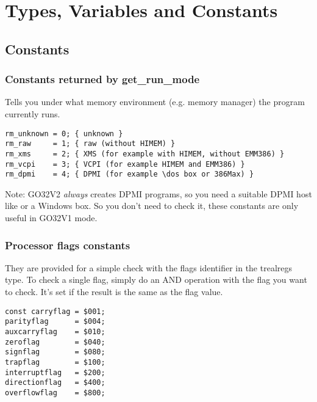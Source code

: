\section{Types, Variables and Constants}
\subsection{Constants}
\subsubsection{Constants returned by get\_run\_mode}
Tells you under what memory environment (e.g. memory manager) the program
currently runs.
\begin{verbatim}
rm_unknown = 0; { unknown }
rm_raw     = 1; { raw (without HIMEM) } 
rm_xms     = 2; { XMS (for example with HIMEM, without EMM386) } 
rm_vcpi    = 3; { VCPI (for example HIMEM and EMM386) } 
rm_dpmi    = 4; { DPMI (for example \dos box or 386Max) }
\end{verbatim}
Note: GO32V2 {\em always} creates DPMI programs, so you need a suitable DPMI
host like  or a Windows \dos box. So you don't need to check it,
these constants are only useful in GO32V1 mode.
\subsubsection{Processor flags constants}
They are provided for a simple check with the flags identifier in the
trealregs type. To check a single flag, simply do an AND operation with the
flag you want to check. It's set if the result is the same as the flag
value.
\begin{verbatim}
const carryflag = $001; 
parityflag      = $004; 
auxcarryflag    = $010; 
zeroflag        = $040; 
signflag        = $080; 
trapflag        = $100; 
interruptflag   = $200;
directionflag   = $400; 
overflowflag    = $800;
\end{verbatim}
